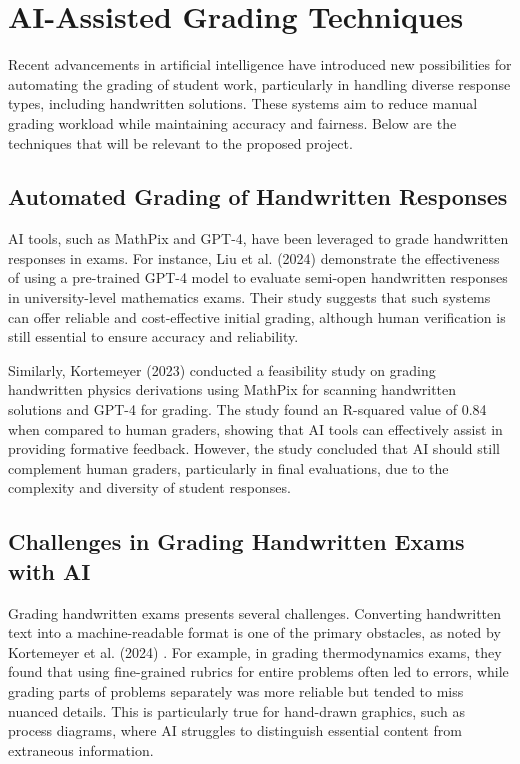 \documentclass[ms,twoside,print]{nuthesis}
\begin{document}
\section{AI-Assisted Grading Techniques} Recent advancements in artificial intelligence have introduced 
new possibilities for automating the grading of student work, particularly in handling diverse response 
types, including handwritten solutions. These systems aim to reduce manual grading workload while 
maintaining accuracy and fairness. Below are the techniques that will be relevant to the proposed project.

\subsection{Automated Grading of Handwritten Responses}

AI tools, such as MathPix and GPT-4, have been leveraged to grade handwritten responses in exams. 
For instance, Liu et al. (2024) \cite{Liu2024} demonstrate the effectiveness of using a pre-trained 
GPT-4 model to evaluate semi-open handwritten responses in university-level mathematics exams. Their 
study suggests that such systems can offer reliable and cost-effective initial grading, although human 
verification is still essential to ensure accuracy and reliability.

Similarly, Kortemeyer (2023) \cite{Kortemeyer2023} conducted a feasibility study on grading 
handwritten physics derivations using MathPix for scanning handwritten solutions and GPT-4 for 
grading. The study found an R-squared value of 0.84 when compared to human graders, showing that 
AI tools can effectively assist in providing formative feedback. However, the study concluded that 
AI should still complement human graders, particularly in final evaluations, due to the complexity 
and diversity of student responses.

\subsection{Challenges in Grading Handwritten Exams with AI}

Grading handwritten exams presents several challenges. Converting handwritten text into a 
machine-readable format is one of the primary obstacles, as noted by Kortemeyer et al. (2024) 
\cite{Kortemeyer2024}. For example, in grading thermodynamics exams, they found that using 
fine-grained rubrics for entire problems often led to errors, while grading parts of problems 
separately was more reliable but tended to miss nuanced details. This is particularly true for 
hand-drawn graphics, such as process diagrams, where AI struggles to distinguish essential content 
from extraneous information.
\end{document}
